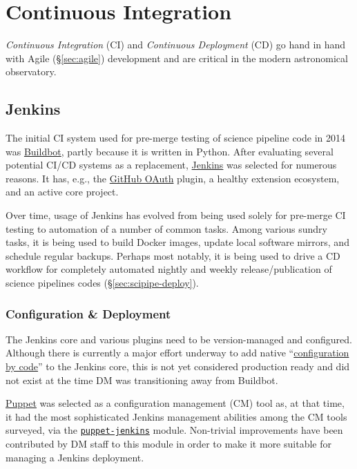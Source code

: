 \section{Continuous Integration}

\emph{Continuous Integration} (CI) and \emph{Continuous Deployment} (CD) go hand in hand with Agile (\S\ref{sec:agile}) development  and  are  critical in the  modern astronomical observatory.\cite{2014arXiv1407.6463E}

\subsection{Jenkins}
\label{sec:jenkins}

 The initial CI system used for pre-merge testing of science pipeline code in 2014  was \href{https://buildbot.net/}{Buildbot}, partly because it is written in Python.
After evaluating several potential CI/CD systems as a replacement,
\href{https://jenkins.io/}{Jenkins} was selected for numerous reasons.
It has, e.g.,  the \href{https://plugins.jenkins.io/github-oauth}{GitHub OAuth} plugin,
a healthy extension ecosystem, and an active core project.

Over time, usage of Jenkins has evolved from being used solely for pre-merge
CI testing to automation of a number of common tasks.  Among various sundry
tasks, it is being used to build Docker images, update local software mirrors, and
schedule regular backups.  Perhaps most notably, it is being used to drive a
CD workflow for completely automated nightly and weekly
release/publication of science pipelines codes (\S\ref{sec:scipipe-deploy}).

\subsubsection{Configuration \& Deployment}

The Jenkins core and various plugins need to be version-managed and configured.
Although there is currently a major effort underway to add native
``\href{https://github.com/jenkinsci/configuration-as-code-plugin}{configuration by code}'' to
the Jenkins core, this is not yet considered production ready and did not exist
at the time DM was transitioning away from Buildbot.

\href{https://puppet.com/}{Puppet} was selected as a configuration management (CM) tool as, at that time, it had the most sophisticated Jenkins
management abilities among the CM tools surveyed, via the \href{https://github.com/voxpupuli/puppet-jenkins}{\texttt{puppet-jenkins}} module.
Non-trivial improvements have been contributed by DM staff to this module\cite{puppetconf-jenkins} in order to make it more suitable for managing a Jenkins deployment.

